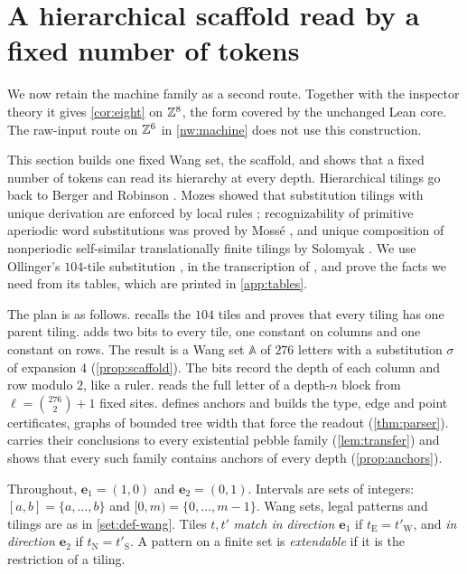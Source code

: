 \section{A hierarchical scaffold read by a fixed number of tokens}\label{sec:scaffold}

We now retain the machine family as a second route. Together with the inspector theory it gives \cref{cor:eight} on $\mathbb{Z}^8$, the form covered by the unchanged Lean core. The raw-input route on $\mathbb{Z}^6$ in \cref{nw:machine} does not use this construction.


This section builds one fixed Wang set, the scaffold, and shows that a fixed number of tokens can read its hierarchy at every depth. Hierarchical tilings go back to Berger \cite{Berger66} and Robinson \cite{Robinson71}. Mozes showed that substitution tilings with unique derivation are enforced by local rules \cite{Mozes89}; recognizability of primitive aperiodic word substitutions was proved by Moss\'e \cite{Mosse92}, and unique composition of nonperiodic self-similar translationally finite tilings by Solomyak \cite{Solomyak98}. We use Ollinger's $104$-tile substitution \cite{Ollinger08}, in the transcription of \cite{LeanWang}, and prove the facts we need from its tables, which are printed in \cref{app:tables}.

The plan is as follows.  recalls the $104$ tiles and proves that every tiling has one parent tiling.  adds two bits to every tile, one constant on columns and one constant on rows. The result is a Wang set $\mathbb A$ of $276$ letters with a substitution $\sigma$ of expansion $4$ (\cref{prop:scaffold}). The bits record the depth of each column and row modulo $2$, like a ruler.  reads the full letter of a depth-$n$ block from $\ell=\binom{276}{2}+1$ fixed sites.  defines anchors and builds the type, edge and point certificates, graphs of bounded tree width that force the readout (\cref{thm:parser}).  carries their conclusions to every existential pebble family (\cref{lem:transfer}) and shows that every such family contains anchors of every depth (\cref{prop:anchors}).

Throughout, $\mathbf e_1=(1,0)$ and $\mathbf e_2=(0,1)$. Intervals are sets of integers: $[a,b]=\{a,\dots,b\}$ and $[0,m)=\{0,\dots,m-1\}$. Wang sets, legal patterns and tilings are as in \cref{set:def-wang}. Tiles $t,t'$ \emph{match in direction $\mathbf e_1$} if $t_{\mathrm E}=t'_{\mathrm W}$, and \emph{in direction $\mathbf e_2$} if $t_{\mathrm N}=t'_{\mathrm S}$. A pattern on a finite set is \emph{extendable} if it is the restriction of a tiling.

